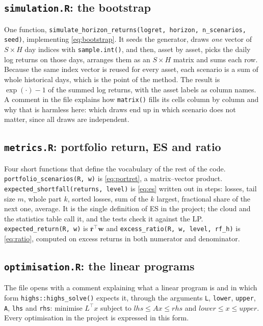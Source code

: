 \documentclass[11pt,a4paper]{article}
\newcommand{\w}{\mathbf{w}}
\newcommand{\rr}{\mathbf{r}}
\newcommand{\code}[1]{\texttt{#1}}
\newcommand{\file}[1]{\texttt{#1}}
\theoremstyle{plain}
\theoremstyle{remark}
\begin{document}
\subsection{\file{simulation.R}: the bootstrap}

One function, \code{simulate\_horizon\_returns(logret, horizon, n\_scenarios,
seed)}, implementing \eqref{eq:bootstrap}. It seeds the generator, draws
\emph{one} vector of $S\times H$ day indices with \code{sample.int()}, and
then, asset by asset, picks the daily log returns on those days, arranges
them as an $S\times H$ matrix and sums each row. Because the same index
vector is reused for every asset, each scenario is a sum of whole
historical days, which is the point of the method. The result is
$\exp(\cdot) - 1$ of the summed log returns, with the asset labels as column
names. A comment in the file explains how \code{matrix()} fills its cells
column by column and why that is harmless here: which draws end up in which
scenario does not matter, since all draws are independent.

\subsection{\file{metrics.R}: portfolio return, ES and ratio}

Four short functions that define the vocabulary of the rest of the code.
\code{portfolio\_scenarios(R, w)} is \eqref{eq:portret}, a matrix--vector
product. \code{expected\_shortfall(returns, level)} is \eqref{eq:es} written
out in steps: losses, tail size $m$, whole part $k$, sorted losses, sum of
the $k$ largest, fractional share of the next one, average. It is the single
definition of ES in the project; the cloud and the statistics table call
it, and the tests check it against the LP. \code{expected\_return(R, w)} is
$\bar{\rr}^\top\w$ and \code{excess\_ratio(R, w, level, rf\_h)} is
\eqref{eq:ratio}, computed on excess returns in both numerator and
denominator.

\subsection{\file{optimisation.R}: the linear programs}
\label{sec:code-opt}

The file opens with a comment explaining what a linear program is and in
which form \code{highs::highs\_solve()} expects it, through the arguments
\code{L}, \code{lower}, \code{upper}, \code{A}, \code{lhs} and \code{rhs}:
minimise $L^\top x$ subject to $\mathit{lhs} \le Ax \le \mathit{rhs}$ and
$\mathit{lower} \le x \le \mathit{upper}$. Every optimisation in the project
is expressed in this form.
\end{document}
